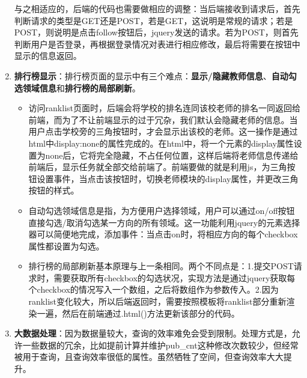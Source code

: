 \begin{enumerate}
与之相适应的，后端的代码也需要做相应的调整：当后端接收到请求后，首先判断请求的类型是GET还是POST，若是GET，这说明是常规的请求；若是POST，则说明是点击follow按钮后，jquery发送的请求。若为POST，则首先判断用户是否登录，再根据登录情况对表进行相应修改，最后将需要在按钮中显示的信息返回。

\item {\bf 排行榜显示}：排行榜页面的显示中有三个难点：{\bf 显示/隐藏教师信息}、{\bf 自动勾选领域信息}和{\bf 排行榜的局部刷新}。
\begin{itemize}
\item 访问ranklist页面时，后端会将学校的排名连同该校老师的排名一同返回给前端，而为了不让前端显示的过于冗杂，我们默认会隐藏老师的信息。当用户点击学校旁的三角按钮时，才会显示出该校的老师。这一操作是通过html中display:none的属性完成的。在html中，将一个元素的display属性设置为none后，它将完全隐藏，不占任何位置，这样后端将老师信息传递给前端后，显示任务就全部交给前端了。前端要做的就是利用js，为三角按钮设置事件，当点击该按钮时，切换老师模块的display属性，并更改三角按钮的样式。
\item 自动勾选领域信息是指，为方便用户选择领域，用户可以通过on/off按钮直接勾选/取消勾选某一方向的所有领域。这一功能利用jquery的元素选择器可以简便地完成，添加事件：当点击on时，将相应方向的每个checkbox属性都设置为勾选。
\item 排行榜的局部刷新基本原理与上一条相同。两个不同点是：1.提交POST请求时，需要获取所有checkbox的勾选状况，实现方法是通过jquery获取每个checkbox的情况写入一个数组，之后将数组作为参数传入。2.因为ranklist变化较大，所以后端返回时，需要按照模板将ranklist部分重新渲染一遍，然后在前端通过.html()方法更新该部分的代码。
\end{itemize}

\item {\bf 大数据处理}：因为数据量较大，查询的效率难免会受到限制。处理方式是，允许一些数据的冗余，比如提前计算并维护pub\_cnt这种修改次数较少，但经常被用于查询，且查询效率很低的属性。虽然牺牲了空间，但查询效率大大提升。
\end{enumerate}


